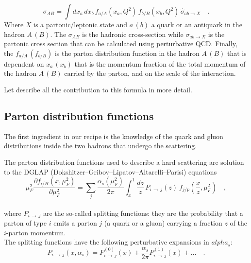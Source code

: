 \begin{equation}
	\sigma_{AB}=\displaystyle\int dx_a\,dx_b\,f_{a/A}(x_a,Q^2)\,f_{b/B}(x_b,Q^2)\,\hat{\sigma}_{ab \rightarrow X}\quad .
\label{eq:factorization2}
\end{equation}
Where $X$ is a partonic/leptonic state and $a\,(b)$ a quark or an antiquark in the hadron $A\,(B)$. The $\sigma_{AB}$ is the hadronic cross-section while $\sigma_{ab\rightarrow X}$ is the partonic cross section that can be calculated using perturbative QCD. Finally, the $f_{a/A}\,(f_{b/B})$ is the parton distribution function in the hadron $A\,(B)$ that is dependent on $x_a\,(x_b)$ that is the momentum fraction of the total momentum of the hadron $A\,(B)$ carried by the parton, and on the scale of the interaction. 

Let describe all the contribution to this formula in more detail.

\subsection{Parton distribution functions}

The first ingredient in our recipe is the knowledge of the quark and gluon distributions inside the two hadrons that undergo the scattering. 

The parton distribution functions used to describe a hard scattering are solution to the DGLAP (Dokshitzer–Gribov–Lipatov–Altarelli–Parisi) equations \cite{Lipatov:400357, Gribov:427157, ALTARELLI1977298, Dokshitzer:1977sg}
\\
\begin{equation}
	\mu_F^2\frac{\partial f_{i/H}(x,\mu_F^2)}{\partial\mu_F^2}=\displaystyle\sum_j\frac{\alpha_s(\mu_F^2)}{2\pi}\displaystyle\int_x^1 \frac{dz}{z}\, P_{i\,\rightarrow\,j}(z)\ f_{j/p}\left(\frac{x}{z},\mu_F^2\right)\quad ,
\end{equation}
\\
where $P_{i\,\rightarrow\,j}$ are the so-called splitting functions: they are the probability that a parton of type $i$ emits a parton $j$ (a quark or a gluon) carrying a fraction $z$ of the $i$-parton momentum.
\\
The splitting functions have the following perturbative expansions in $alpha_s$: 
\begin{equation}
	P_{i\,\rightarrow\,j}(x,\alpha_s)=P_{i\,\rightarrow\,j}^{(0)}(x)+\frac{\alpha_s}{2\pi}P_{i\,\rightarrow\,j}^{(1)}(x)+\dots\quad .
\end{equation}


